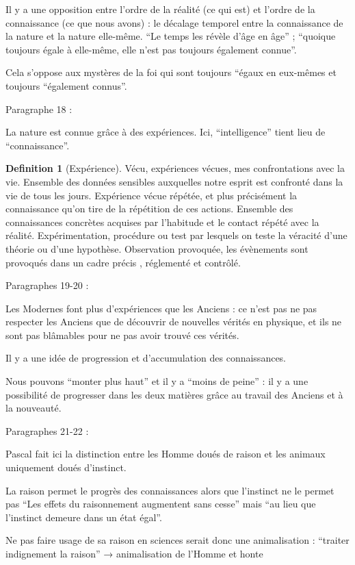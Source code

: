 \documentclass[french]{book}
\theoremstyle{definition}
\newtheorem*{dfn}{Definition}
\begin{document}
Il y a une opposition entre l’ordre de la réalité (ce qui est) et l’ordre de la connaissance (ce que nous avons) : le décalage temporel entre la connaissance de la nature et la nature elle-même. “Le temps les révèle d’âge en âge” ; “quoique toujours égale à elle-même, elle n’est pas toujours également connue”.

Cela s’oppose aux mystères de la foi qui sont toujours “égaux en eux-mêmes et toujours “également connus”.

Paragraphe 18 :

La nature est connue grâce à des expériences.
Ici, “intelligence” tient lieu de “connaissance”.

\begin{dfn}[Expérience] 
Vécu, expériences vécues, mes confrontations avec la vie. Ensemble des données sensibles auxquelles notre esprit est confronté dans la vie de tous les jours.
Expérience vécue répétée, et plus précisément la connaissance qu'on tire de la répétition de ces actions. Ensemble des connaissances concrètes acquises par l'habitude et le contact répété avec la réalité.
Expérimentation, procédure ou test par lesquels on teste la véracité d'une théorie ou d'une hypothèse. Observation provoquée, les évènements sont provoqués dans un cadre précis , réglementé et contrôlé.
\end{dfn}


Paragraphes 19-20 :

Les Modernes font plus d'expériences que les Anciens : ce n’est pas ne pas respecter les Anciens que de découvrir de nouvelles vérités en physique, et ils ne sont pas blâmables pour ne pas avoir trouvé ces vérités.

Il y a une idée de progression et d'accumulation des connaissances.

Nous pouvons “monter plus haut” et il y a “moins de peine” : il y a une possibilité de progresser dans les deux matières grâce au travail des Anciens et à la nouveauté.

Paragraphes 21-22 :

Pascal fait ici la distinction entre les Homme doués de raison et les animaux uniquement doués d’instinct.

La raison permet le progrès des connaissances alors que l’instinct ne le permet pas “Les effets du raisonnement augmentent sans cesse” mais “au lieu que l'instinct demeure dans un état égal”.

Ne pas faire usage de sa raison en sciences serait donc une animalisation : “traiter indignement la raison” → animalisation de l’Homme et honte
\end{document}
